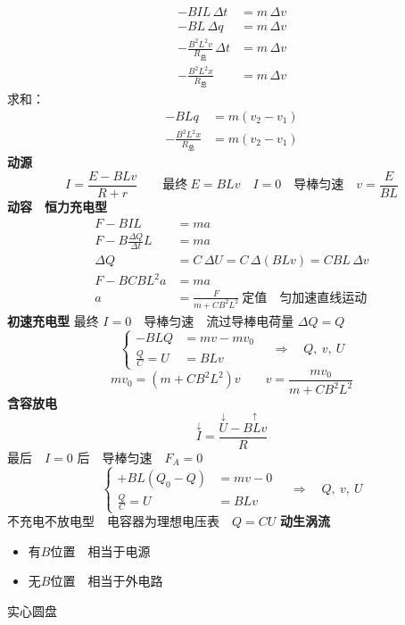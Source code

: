 \begin{align*}
-BIL\,\Delta t&=m\,\Delta v\\
-BL\,\Delta q&=m\,\Delta v\\
-\frac{B^2L^2v}{R_{\text{总}}}\,\Delta t&=m\,\Delta v\\
-\frac{B^2L^2x}{R_{\text{总}}}&=m\,\Delta v
\end{align*}
求和：
\begin{align*}
-BLq&=m(v_2-v_1)\\
-\frac{B^2L^2x}{R_{\text{总}}}&=m(v_2-v_1)
\end{align*}
\textbf{动源}
\[
I=\frac{E-BLv}{R+r}\qquad\text{最终}\ E=BLv\quad I=0\quad\text{导棒匀速}\quad v=\frac{E}{BL}
\]
\textbf{动容}　\textbf{恒力充电型}
\begin{align*}
F-BIL&=ma\\
F-B\frac{\Delta Q}{\Delta t}L&=ma\\
\Delta Q&=C\,\Delta U=C\,\Delta(BLv)=CBL\,\Delta v\\
F-BCBL^{2}a&=ma\\
a&=\frac{F}{m+CB^2L^2}\ \text{定值}\quad\text{匀加速直线运动}
\end{align*}
\textbf{初速充电型}
最终 $I=0$　导棒匀速　流过导棒电荷量 $\Delta Q=Q$
\[
\left\{\begin{aligned}
-BLQ&=mv-mv_0\\
\frac{Q}{C}=U&=BLv
\end{aligned}\right.
\quad\Rightarrow\quad Q,\ v,\ U
\]
\[
mv_0=(m+CB^2L^2)v\qquad v=\frac{mv_0}{m+CB^2L^2}
\]
\textbf{含容放电}
\[
\overset{\downarrow}{I}=\frac{\overset{\downarrow}{U}-\overset{\uparrow}{BLv}}{R}
\]
最后　$I=0$ 后　导棒匀速　$F_A=0$
\[
\left\{\begin{aligned}
+BL(Q_0-Q)&=mv-0\\
\frac{Q}{C}=U&=BLv
\end{aligned}\right.
\quad\Rightarrow\quad Q,\ v,\ U
\]
不充电不放电型　电容器为理想电压表　$Q=CU$
\textbf{动生涡流}
\begin{itemize}
  \item 有$B$位置　相当于电源
  \item 无$B$位置　相当于外电路
\end{itemize}
实心圆盘


